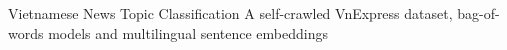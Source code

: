 \documentclass[11pt,a4paper]{article}
\begin{document}
  {Vietnamese News Topic Classification}
  {A self-crawled VnExpress dataset, bag-of-words models and multilingual sentence embeddings}
  {\TXLinks}
\tableofcontents

\end{document}
